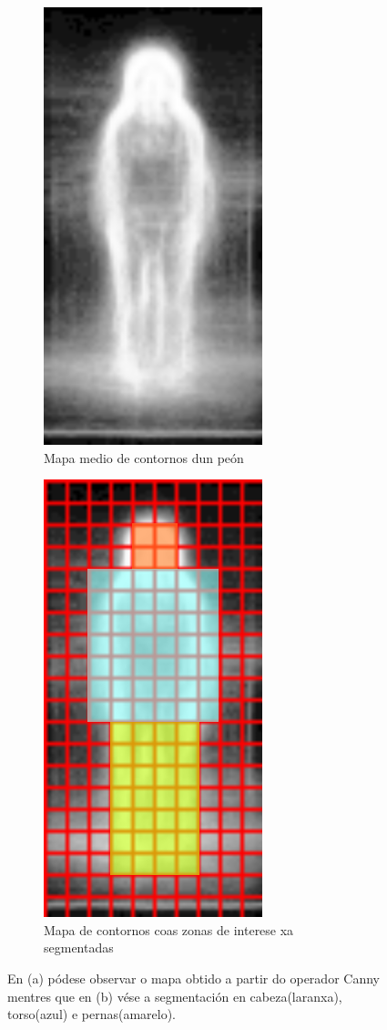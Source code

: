 \documentclass[galician]{./head/uvigo-tfg}
\begin{document}
        
    \begin{figure}[t]
        \centering
        \begin{subfigure}{.5\textwidth}
          \centering
          \includegraphics[width=.4\linewidth]{figures/edge_map_resized.png}
          \caption{Mapa medio de contornos dun peón}
          \label{fig:average1}
        \end{subfigure}%
        \begin{subfigure}{.5\textwidth}
          \centering
          \includegraphics[width=.4\linewidth]{figures/edge_map_grid.png}
          \caption{Mapa de contornos coas zonas de interese xa segmentadas}
          \label{fig:average2}
        \end{subfigure}
        \caption{En (a) pódese observar o mapa obtido a partir do operador Canny mentres que en (b) vése a segmentación en cabeza(laranxa), torso(azul) e pernas(amarelo).  }
        \label{fig:averageEdgeMap}
    \end{figure}
\end{document}
